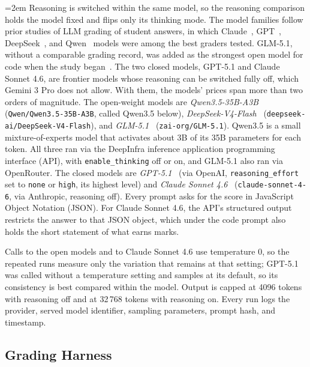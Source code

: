 {\emergencystretch=2em
Reasoning is switched within the same model, so the reasoning comparison holds the model fixed and flips only
its thinking mode. The model families follow prior studies of LLM
grading of student answers, in which Claude~\cite{cipriano_leveraging_2025},
GPT~\cite{li_study_2025,sessler_canai_2025}, DeepSeek~\cite{aminah_evaluating_2025,li_study_2025},
and Qwen~\cite{jiang_eipe_2026,havare_ai-based_2025} models were among the best graders tested.
GLM-5.1, without a comparable grading record, was added as the strongest open model for code when the
study began~\cite{arena_leaderboard_2026}. The two closed models, GPT-5.1 and Claude Sonnet 4.6, are frontier
models whose reasoning can be switched fully off, which Gemini 3 Pro does not allow. With them, the models'
prices span more than two orders of magnitude.
The open-weight models are \emph{Qwen3.5-35B-A3B}~\cite{qwen_qwen35_2026}
(\texttt{Qwen/Qwen3.5-35B-A3B}, called Qwen3.5 below), \emph{DeepSeek-V4-Flash}~\cite{deepseek_v4_2026}
(\texttt{deepseek-ai/\allowbreak DeepSeek-V4-Flash}), and \emph{GLM-5.1}~\cite{glm5_2026} (\texttt{zai-org/GLM-5.1}).
Qwen3.5 is a small mixture-of-experts model that activates about 3B of its 35B parameters for each token. All
three ran via the DeepInfra inference application programming interface (API), with \texttt{enable\_thinking}
off or on, and GLM-5.1 also ran via OpenRouter. The closed models are
\emph{GPT-5.1}~\cite{openai_gpt51_2025} (via OpenAI, \texttt{reasoning\_effort} set to \texttt{none} or \texttt{high}, its highest level) and \emph{Claude Sonnet
4.6}~\cite{anthropic_sonnet46_2026} (\texttt{claude-sonnet-4-6}, via Anthropic, reasoning off). Every prompt asks for the
score in JavaScript Object Notation (JSON). For Claude Sonnet 4.6, the API's structured output restricts the
answer to that JSON object, which under the code prompt also holds the short statement of what earns marks.\par}

Calls to the open models and to Claude Sonnet 4.6 use temperature 0, so the repeated runs measure only the
variation that remains at that setting; GPT-5.1 was called without a temperature setting and samples at its
default, so its consistency is best compared within the model. Output is capped at 4096 tokens with reasoning
off and at 32\,768 tokens with reasoning on. Every run logs the
provider, served model identifier, sampling parameters, prompt hash, and timestamp.

\subsection{Grading Harness}
\label{sec:harness}

